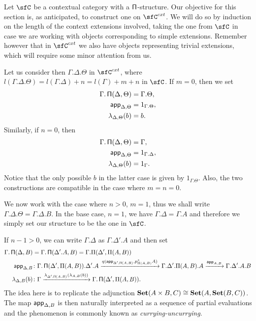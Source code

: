 \begin{construction}
  Let $\sfC$ be a contextual category with a $\operatorname{\mathsf{\Pi}}$-structure. Our objective for
  this section is, as anticipated, to construct one on $\sfC^{cxt}$. We will do
  so by induction on the length of the context extensions involved, taking the
  one from $\sfC$ in case we are working with objects corresponding to simple
  extensions. Remember however that in $\sfC^{cxt}$ we also have objects
  representing trivial extensions, which will require some minor attention from
  us.

  Let us consider then $\Gamma.\Delta.\Theta$ in $\sfC^{cxt}$, where
  $l(\Gamma.\Delta.\Theta)=l(\Gamma.\Delta)+n=l(\Gamma)+m+n$ in $\sfC$. If
  $m=0$, then we set
  \begin{align*}
    \Gamma.\operatorname{\mathsf{\Pi}}(\Delta,\Theta) &=\Gamma.\Theta, \\
    \operatorname{\mathsf{app}}_{\Delta,\Theta} &=1_{\Gamma.\Theta}, \\
    \lambda_{\Delta,\Theta}(b) &=b.
  \end{align*}
  Similarly, if $n=0$, then
  \begin{align*}
    \Gamma.\operatorname{\mathsf{\Pi}}(\Delta,\Theta) &=\Gamma, \\
    \operatorname{\mathsf{app}}_{\Delta,\Theta} &=1_{\Gamma.\Delta}, \\
    \lambda_{\Delta,\Theta}(b) &=1_\Gamma.
  \end{align*}
  Notice that the only possible $b$ in the latter case is given by
  $1_{\Gamma.\Theta}$. Also, the two constructions are compatible in the case
  where $m=n=0$.

  We now work with the case where $n>0$, $m=1$, thus we shall write
  $\Gamma.\Delta.\Theta=\Gamma.\Delta.B$. In the base case, $n=1$, we have
  $\Gamma.\Delta=\Gamma.A$ and therefore we simply set our structure to be the
  one in $\sfC$.

  If $n-1>0$, we can write
  $\Gamma.\Delta$ as $\Gamma.\Delta'.A$ and then set
  \begin{align*}
    \Gamma.\operatorname{\mathsf{\Pi}}(\Delta,B)
    &=\Gamma.\operatorname{\mathsf{\Pi}}(\Delta'.A,B)=\Gamma.\Pi(\Delta',\Pi(A,B)) \\
    \operatorname{\mathsf{app}}_{\Delta,B} &\colon
                    \Gamma.\operatorname{\mathsf{\Pi}}(\Delta',\Pi(A,B)).\Delta'.A
                    \xrightarrow{q(\operatorname{\mathsf{app}}_{\Delta',\operatorname{\mathsf{\Pi}}(A,B)},p^*_{\Pi(A,B)}A)}\Gamma.\Delta'.\Pi(A,B).A
                    \xrightarrow{\operatorname{\mathsf{app}}_{A,B}}\Gamma.\Delta'.A.B \\
    \lambda_{\Delta,B}(b)
    &\colon
    \Gamma
    \xrightarrow{\lambda_{\Delta',\operatorname{\mathsf{\Pi}}(A,B)}(\lambda_{A,B}(b))}
    \Gamma.\operatorname{\mathsf{\Pi}}(\Delta',\Pi(A,B)).
  \end{align*}
  The idea here is to replicate the adjunction $\operatorname{\mathbf{Set}}(A\times
  B,C)\cong\operatorname{\mathbf{Set}}(A,\operatorname{\mathbf{Set}}(B,C))$. The map $\operatorname{\mathsf{app}}_{\Delta,B}$ is then naturally
  interpreted as a sequence of partial evaluations and the phenomenon is
  commonly known as \emph{currying-uncurrying}.


\end{construction}
